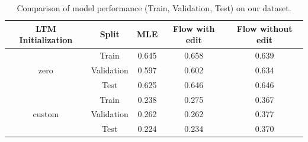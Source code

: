 \begin{table}[h!]
\centering
\begin{tabular}{|c|c|c|c|c|}
\hline
\textbf{LTM Initialization} & \textbf{Split} & \textbf{MLE} & \textbf{Flow with edit} & \textbf{Flow without edit} \\
\hline
\multirow{3}{*}{zero} 
& Train      & 0.645 & 0.658 & 0.639 \\
& Validation & 0.597 & 0.602 & 0.634 \\
& Test       & 0.625 & 0.646 & 0.646 \\
\hline
\multirow{3}{*}{custom} 
& Train      & 0.238 & 0.275 & 0.367 \\
& Validation & 0.262 & 0.262 & 0.377 \\
& Test       & 0.224 & 0.234 & 0.370 \\
\hline
\end{tabular}
\caption{Comparison of model performance (Train, Validation, Test) on our dataset.}
\end{table}

